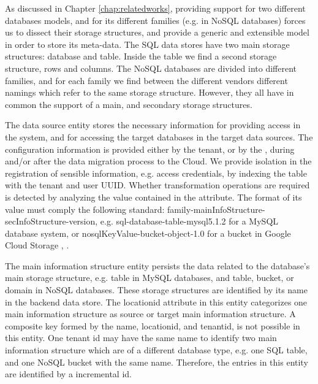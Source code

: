As discussed in Chapter \ref{chap:relatedworks}, providing support for two different databases models, and for its different families (e.g. in \ac{NoSQL} databases) forces us to dissect their storage structures, and provide a generic and extensible model in order to store its meta-data. The \ac{SQL} data stores have two main storage structures: database and table. Inside the table we find a second storage structure, rows and columns. The \ac{NoSQL} databases are divided into different families, and for each family we find between the different vendors different namings which refer to the same storage structure. However, they all have in common the support of a main, and secondary storage structures. 

The data source entity stores the necessary information for providing access in the system, and for accessing the target databases in the target data sources. The configuration information is provided either by the tenant, or by the , during and/or after the data migration process to the Cloud. We provide isolation in the registration of sensible information, e.g. access credentials, by indexing the table with the tenant and user \ac{UUID}. Whether transformation operations are required is detected by analyzing the value contained in the  attribute. The format of its value must comply the following standard: family-mainInfoStructure-secInfoStructure-version, e.g. sql-database-table-mysql5.1.2 for a MySQL database system, or nosqlKeyValue-bucket-object-1.0 for a bucket in Google Cloud Storage \cite{mysqlmanual}, \cite{googlecloudstorage}.  

The main information structure entity persists the data related to the database's main storage structure, e.g. table in MySQL databases, and table, bucket, or domain in \ac{NoSQL} databases. These storage structures are identified by its name in the backend data store. The locationid attribute in this entity categorizes one main information structure as source or target main information structure. A composite key formed by the name, locationid, and tenantid, is not possible in this entity. One tenant id may have the same name to identify two main information structure which are of a different database type, e.g. one \ac{SQL} table, and one \ac{NoSQL} bucket with the same name. Therefore, the entries in this entity are identified by a incremental id.   

